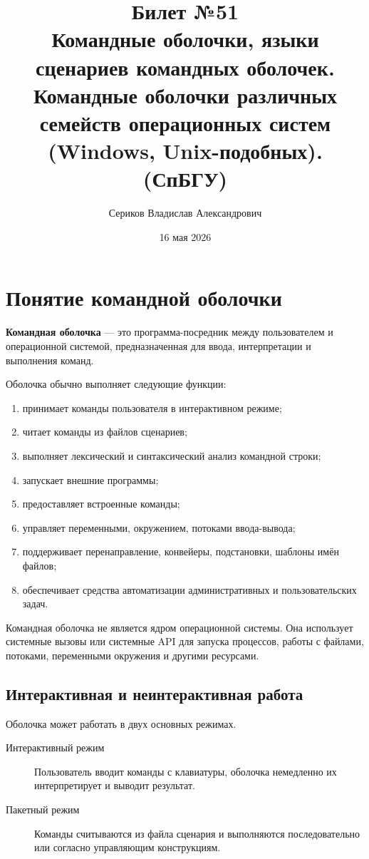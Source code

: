 \documentclass[12pt,a4paper]{article}
\title{Билет №51 \\ \small Командные оболочки, языки сценариев командных оболочек. Командные оболочки различных семейств операционных систем (Windows, Unix-подобных). (СпБГУ)}
\author{Сериков Владислав Александрович}
\date{16 мая 2026}
\begin{document}
\maketitle
\tableofcontents
\newpage

\section{Понятие командной оболочки}

\textbf{Командная оболочка} --- это программа-посредник между пользователем и операционной системой, предназначенная для ввода, интерпретации и выполнения команд.

Оболочка обычно выполняет следующие функции:
\begin{enumerate}
    \item принимает команды пользователя в интерактивном режиме;
    \item читает команды из файлов сценариев;
    \item выполняет лексический и синтаксический анализ командной строки;
    \item запускает внешние программы;
    \item предоставляет встроенные команды;
    \item управляет переменными, окружением, потоками ввода-вывода;
    \item поддерживает перенаправление, конвейеры, подстановки, шаблоны имён файлов;
    \item обеспечивает средства автоматизации административных и пользовательских задач.
\end{enumerate}

Командная оболочка не является ядром операционной системы. Она использует системные вызовы или системные API для запуска процессов, работы с файлами, потоками, переменными окружения и другими ресурсами.

\subsection{Интерактивная и неинтерактивная работа}

Оболочка может работать в двух основных режимах.

\begin{description}
    \item[Интерактивный режим] Пользователь вводит команды с клавиатуры, оболочка немедленно их интерпретирует и выводит результат.
    \item[Пакетный режим] Команды считываются из файла сценария и выполняются последовательно или согласно управляющим конструкциям.
\end{description}
\end{document}
